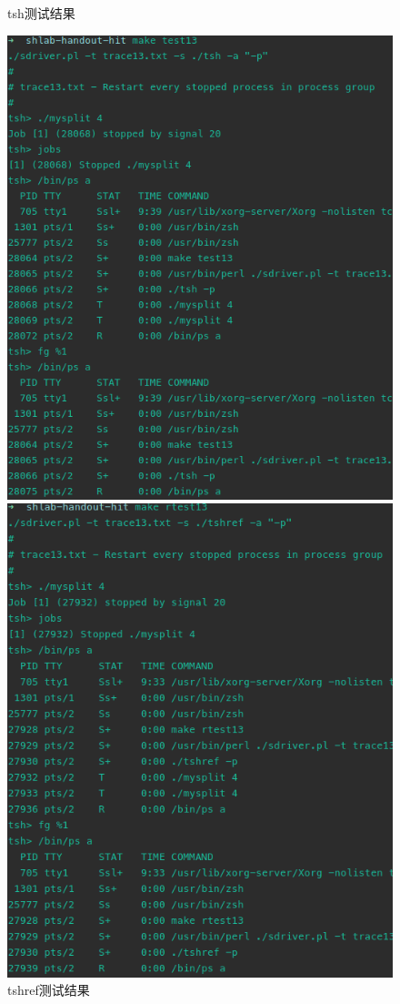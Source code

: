 \begin{figure}[H]
    \begin{minipage}[c]{0.5\linewidth}
        \centering
        \caption{tsh测试结果}
        \includegraphics[width=0.9\linewidth]{figures/test13.png}
    \end{minipage}
    \begin{minipage}[c]{0.5\linewidth}
        \centering
        \caption{tshref测试结果}
        \includegraphics[width=0.9\linewidth]{figures/rtest13.png}
    \end{minipage}
\end{figure}

